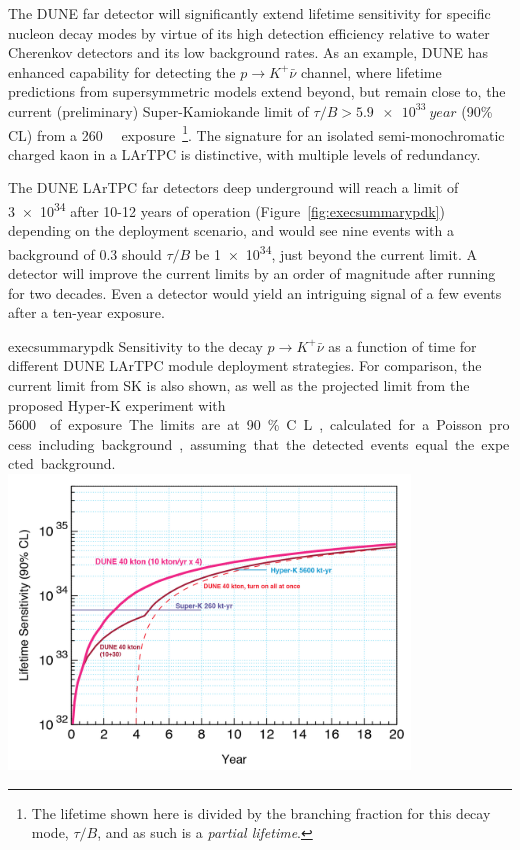The DUNE far detector will significantly extend lifetime sensitivity
for specific nucleon decay modes by virtue of its high detection
efficiency relative to water Cherenkov detectors and its low
background rates.  As an example, DUNE has enhanced capability for
detecting the $p\to K^+\bar{\nu}$ channel, where lifetime
predictions from supersymmetric models extend beyond, but remain close
to, the current (preliminary) Super-Kamiokande limit of $\tau/B >
\SI{5.9e33}{year}$ (90\% CL) from a \SI[number-unit-product = -,
inter-unit-product=\ensuremath{{}\cdot{}}]{260}{\kt\year}
exposure~\cite{kearns_isoups}\footnote{The lifetime shown here is
  divided by the branching fraction for this decay mode, $\tau/B$, and
  as such is a \emph{partial lifetime}.}.  The signature for an
isolated semi-monochromatic charged kaon in a LArTPC is distinctive,
with multiple levels of redundancy. 

The DUNE LArTPC far detectors deep underground will reach a limit of
\SI{3e34}{\year} after 10-12 years of operation
(Figure~\ref{fig:execsummarypdk}) depending on the deployment
scenario, and would see nine events with a background of 0.3 should
$\tau/B$ be \SI{1e34}{\year}, just beyond the current limit. A
 detector will improve the current limits by an order of
magnitude after running for two decades. Even a  detector
would yield an intriguing signal of a few events after a ten-year
exposure.


\begin{cdrfigure}{execsummarypdk} {Sensitivity to the
    decay $p\to K^+ \bar{\nu}$ as a function of time for different DUNE 
LArTPC module deployment strategies. 
  For comparison, the current limit from SK is also shown, as well as the projected limit from the proposed Hyper-K experiment with \SI{5600}\ktyr{} of exposure.
  The limits are at 90\% C.L., calculated for
  a Poisson process including background, assuming that the detected events
  equal the expected background.}
\includegraphics[width=0.8\textwidth]{volume-physics/figures/lar4x10.png}
\end{cdrfigure}

